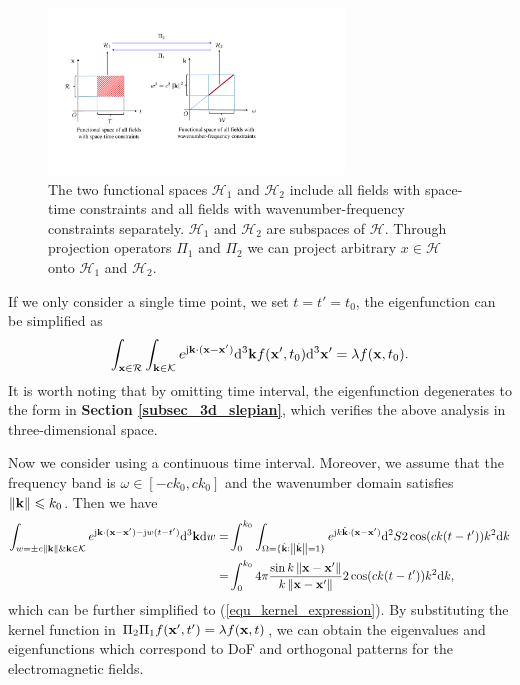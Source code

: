 \documentclass[12pt,draftclsnofoot,journal,onecolumn]{IEEEtran}
\begin{document}
		
	\begin{figure}
		\centering 
		\includegraphics[width=0.7\textwidth]{figs/H1H2projection.pdf} 
		\caption{The two functional spaces $\mathcal{H}_1$ and $\mathcal{H}_2$ include all fields with space-time constraints and all fields with wavenumber-frequency constraints separately. $\mathcal{H}_1$ and $\mathcal{H}_2$ are subspaces of $\mathcal{H}$. Through projection operators $\Pi_1$ and $\Pi_2$ we can project arbitrary $x \in \mathcal{H}$ onto $\mathcal{H}_1$ and $\mathcal{H}_2$.  } 
		\label{H1H2projection}
	\end{figure}
	
	
	If we only consider a single time point, we set $t=t'=t_0$, the eigenfunction can be simplified as 
	\begin{equation}
		\begin{aligned}
			\int_{{\bf x} \in \mathcal{R}}  \int_{ {\bf k} \in \mathcal{K}} e^{{\rm j}{\bf k}\cdot({\bf x}-{\bf x}')}
			{\rm d}^3{\bf k} f({\bf x}',t_0){\rm d}^3{\bf x}' = \lambda f({\bf x},t_0).
		\end{aligned}
	\end{equation}
	It is worth noting that by omitting time interval, the eigenfunction degenerates to the form in {\bf Section \ref{subsec_3d_slepian}}, which verifies the above analysis in three-dimensional space. 
	
	Now we consider using a continuous time interval. Moreover, we assume that the frequency band is $\omega \in [-ck_0, ck_0]$ and the wavenumber domain satisfies $\left\| {\bf k} \right\| \leqslant k_0$. Then we have 
	\begin{equation}
		\begin{aligned}
			\int_{w= \pm c \left\| {\bf k} \right\| \& {\bf k} \in \mathcal{K}} e^{{\rm j}{\bf k}\cdot({\bf x}-{\bf x}')-{\rm j}w(t-t')}
			{\rm d}^3{\bf k}{\rm d}w
			= & \int_{0}^{k_0} \int_{{\Omega}=\{\hat{\bf k}: \left\| \hat{\bf k} \right\|=1\}} e^{{\rm j}k \hat{\bf k}\cdot({\bf x}-{\bf x}')} {\rm d}^2S 2\cos(ck(t-t')) k^2{\rm d}k
			\\ = & \int_{0}^{k_0} 4\pi \frac{\sin k \left\| {\bf x}-{\bf x}' \right\|}{k \left\| {\bf x}-{\bf x}' \right\|}  2\cos(ck(t-t'))k^2{\rm d}k,
		\end{aligned}
	\end{equation}
	which can be further simplified to (\ref{equ_kernel_expression}).
	By substituting the kernel function in $\Pi_2 \Pi_1 f({\bf x}',t') = \lambda f({\bf x},t)$, we can obtain the eigenvalues and eigenfunctions which correspond to DoF and orthogonal patterns for the electromagnetic fields.
	
\end{document}
